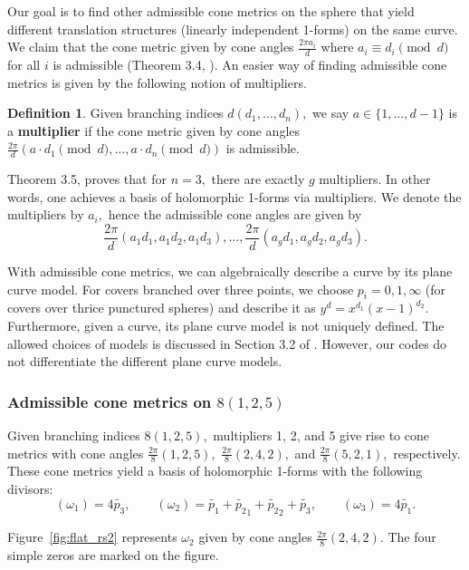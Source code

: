 \documentclass[12pt,reqno]{amsart}
\theoremstyle{definition}
\newtheorem{defn}{Definition}
\theoremstyle{remark}
\begin{document}
Our goal is to find other admissible cone metrics on the sphere that yield different translation structures (linearly independent 1-forms) on the same curve. We claim that the cone metric given by cone angles $\frac{2 \pi a_i}{d}$ where $a_i \equiv d_i \pmod d$ for all $i$ is admissible (Theorem 3.4, \cite{dthesis}). An easier way of finding admissible cone metrics is given by the following notion of multipliers.

\begin{defn} Given branching indices $d (d_1, \ldots , d_n),$ we say $a \in \{1, \ldots, d - 1\}$ is a \textbf{multiplier} if the cone metric given by cone angles $\frac{2 \pi}{d} (a \cdot d_1 \pmod d, \ldots , a \cdot d_n \pmod d)$ is admissible. 
\end{defn}

Theorem 3.5, \cite{dthesis} proves that for $n = 3,$ there are exactly $g$ multipliers. In other words, one achieves a basis of holomorphic 1-forms via multipliers. We denote the multipliers by $a_i,$ hence the admissible cone angles are given by $$\frac{2\pi}{d}(a_1 d_1, a_1 d_2, a_1 d_3), \ldots , \frac{2\pi}{d}(a_g d_1, a_g d_2, a_g d_3).$$ 

With admissible cone metrics, we can algebraically describe a curve by its plane curve model. For covers branched over three points, we choose $p_i = 0, 1, \infty$ (for covers over thrice punctured spheres) and describe it as $y^d = x^{d_1} (x-1)^{d_2}.$ Furthermore, given a curve, its plane curve model is not uniquely defined. The allowed choices of models is discussed in Section 3.2 of \cite{dthesis}. However, our codes do not differentiate the different plane curve models.

\subsubsection*{Admissible cone metrics on $8 (1, 2, 5)$} Given branching indices $8 (1, 2, 5),$ multipliers 1, 2, and 5 give rise to cone metrics with cone angles $\frac{2 \pi}{8}(1, 2, 5),$ $\frac{2 \pi}{8}(2, 4, 2),$ and $\frac{2 \pi}{8}(5, 2, 1),$ respectively. These cone metrics yield a basis of holomorphic 1-forms with the following divisors: $$(\omega_1) = 4 \widetilde{p_3}, \qquad (\omega_2) = \widetilde{p_1} + \widetilde{p_2}_1 + \widetilde{p_2}_2 + \widetilde{p_3}, \qquad (\omega_3) = 4 \widetilde{p_1}.$$

Figure~\ref{fig:flat_rs2} represents $\omega_2$ given by cone angles $\frac{2 \pi}{8}(2, 4, 2).$ The four simple zeros are marked on the figure.
\end{document}
